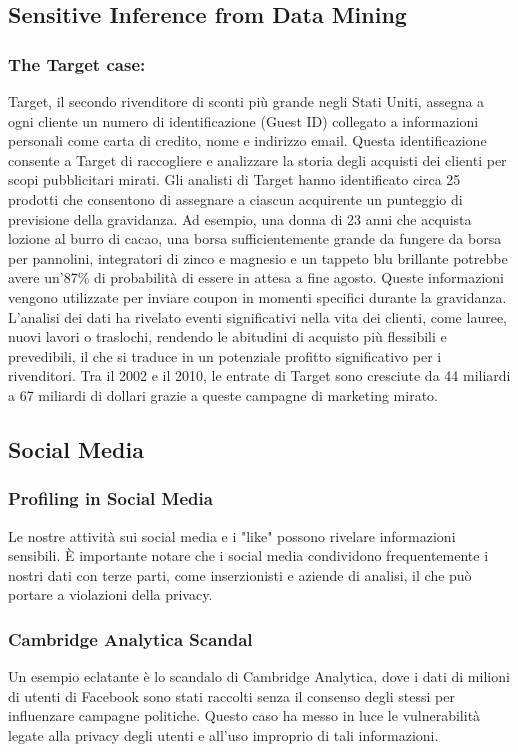 \documentclass{report}
\begin{document}
\subsection{Sensitive Inference from Data Mining}

\subsubsection{The Target case:} 
Target, il secondo rivenditore di sconti più grande negli Stati Uniti, assegna a ogni cliente un numero di identificazione (Guest ID) collegato a informazioni personali come carta di credito, nome e indirizzo email. Questa identificazione consente a Target di raccogliere e analizzare la storia degli acquisti dei clienti per scopi pubblicitari mirati. 
Gli analisti di Target hanno identificato circa 25 prodotti che consentono di assegnare a ciascun acquirente un punteggio di previsione della gravidanza. Ad esempio, una donna di 23 anni che acquista lozione al burro di cacao, una borsa sufficientemente grande da fungere da borsa per pannolini, integratori di zinco e magnesio e un tappeto blu brillante potrebbe avere un'87\% di probabilità di essere in attesa a fine agosto. Queste informazioni vengono utilizzate per inviare coupon in momenti specifici durante la gravidanza. 
L'analisi dei dati ha rivelato eventi significativi nella vita dei clienti, come lauree, nuovi lavori o traslochi, rendendo le abitudini di acquisto più flessibili e prevedibili, il che si traduce in un potenziale profitto significativo per i rivenditori. Tra il 2002 e il 2010, le entrate di Target sono cresciute da 44 miliardi a 67 miliardi di dollari grazie a queste campagne di marketing mirato.


\subsection{Social Media}

\subsubsection{Profiling in Social Media}
Le nostre attività sui social media e i "like" possono rivelare informazioni sensibili. 
È importante notare che i social media condividono frequentemente i nostri dati con terze parti, come inserzionisti e aziende di analisi, il che può portare a violazioni della privacy.

\subsubsection{Cambridge Analytica Scandal}
Un esempio eclatante è lo scandalo di Cambridge Analytica, dove i dati di milioni di utenti di Facebook sono stati raccolti senza il consenso degli stessi per influenzare campagne politiche. 
Questo caso ha messo in luce le vulnerabilità legate alla privacy degli utenti e all'uso improprio di tali informazioni.
\end{document}

